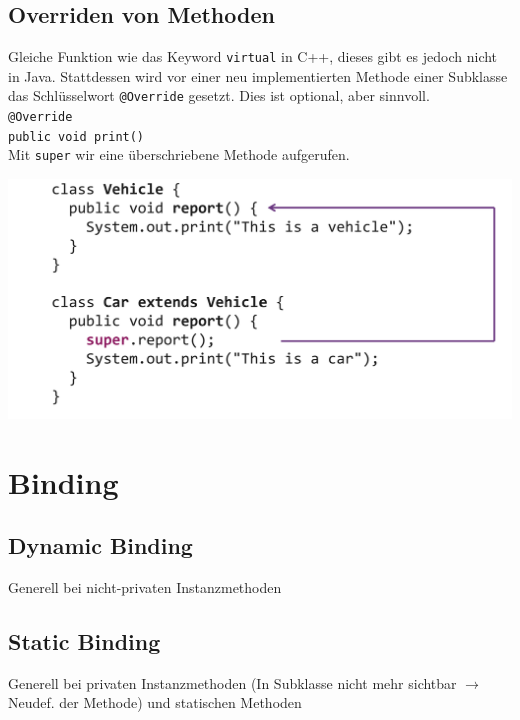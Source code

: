\subsection{Overriden von Methoden}
Gleiche Funktion wie das Keyword \verb|virtual| in C++, dieses gibt es jedoch nicht in Java. Stattdessen wird
vor einer neu implementierten Methode einer Subklasse das Schlüsselwort \verb|@Override| gesetzt. Dies ist optional, aber sinnvoll.\\
\verb|@Override|\\
\verb|public void print()|\\

Mit \verb|super| wir eine überschriebene Methode aufgerufen.
\begin{center}
    \includegraphics[width=0.9\columnwidth]{pictures/super.png}
\end{center}

\section{Binding}
\subsection{Dynamic Binding}
Generell bei nicht-privaten Instanzmethoden

\subsection{Static Binding}
Generell bei privaten Instanzmethoden (In Subklasse nicht mehr sichtbar $\rightarrow$ Neudef. der Methode) und statischen Methoden